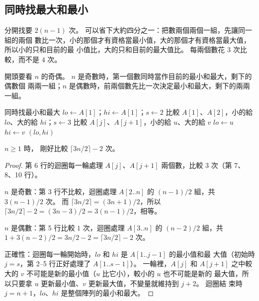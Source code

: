 \subsection{同時找最大和最小}

分開找要 $2(n - 1)$ 次。 可以省下大約四分之一：把數兩個兩個一組，先讓同一組的兩個
數比一次，小的那個才有資格當最小值，大的那個才有資格當最大值，所以小的只和目前的最
小值比，大的只和目前的最大值比。 每兩個數花 $3$ 次比較，而不是 $4$ 次。

開頭要看 $n$ 的奇偶。 $n$ 是奇數時，第一個數同時當作目前的最小和最大，剩下的偶數個
兩兩一組；$n$ 是偶數時，前兩個數先比一次決定最小和最大，剩下的兩兩一組。

\begin{pseudo}[label=alg:sel-minmax]{同時找最小和最大}
        \State $\mathit{lo} \gets A[1]$；$\mathit{hi} \gets A[1]$；$s \gets 2$
    \Else
        \State 比較 $A[1]$、$A[2]$，小的給 $\mathit{lo}$、大的給 $\mathit{hi}$；$s \gets 3$
    \EndIf
        \State 比較 $A[j]$、$A[j + 1]$，小的給 $u$、大的給 $v$
            \State $\mathit{lo} \gets u$
        \EndIf
            \State $\mathit{hi} \gets v$
        \EndIf
    \EndFor
    \State \Return $(\mathit{lo}, \mathit{hi})$
\EndFunction
\end{pseudo}

\begin{theorem}
\label{thm:sel-minmax}
$n \ge 1$ 時， 剛好比較 $\lceil 3n/2 \rceil - 2$ 次。
\end{theorem}

\begin{proof}
第 6 行的迴圈每一輪處理 $A[j]$、$A[j+1]$ 兩個數，比較 $3$ 次（第 7、8、10 行）。

$n$ 是奇數：第 3 行不比較，迴圈處理 $A[2..n]$ 的 $(n - 1)/2$ 組，共
$3(n-1)/2$ 次。 而 $\lceil 3n/2 \rceil = (3n + 1)/2$，所以
$\lceil 3n/2 \rceil - 2 = (3n - 3)/2 = 3(n-1)/2$，相等。

$n$ 是偶數：第 5 行比較 $1$ 次，迴圈處理 $A[3..n]$ 的 $(n-2)/2$ 組，共
$1 + 3(n-2)/2 = 3n/2 - 2 = \lceil 3n/2 \rceil - 2$ 次。

正確性：迴圈每一輪開始時，$\mathit{lo}$ 和 $\mathit{hi}$ 是 $A[1..j-1]$ 的最小值和最
大值（初始時 $j = s$，第 2--5 行正好處理了 $A[1..s-1]$）。 一輪裡，$A[j]$ 和
$A[j+1]$ 之中較大的 $v$ 不可能是新的最小值（$u$ 比它小），較小的 $u$ 也不可能是新的
最大值，所以只要拿 $u$ 更新最小值、$v$ 更新最大值，不變量就維持到 $j + 2$。 迴圈結
束時 $j = n + 1$，$\mathit{lo}$、$\mathit{hi}$ 是整個陣列的最小和最大。
\end{proof}

